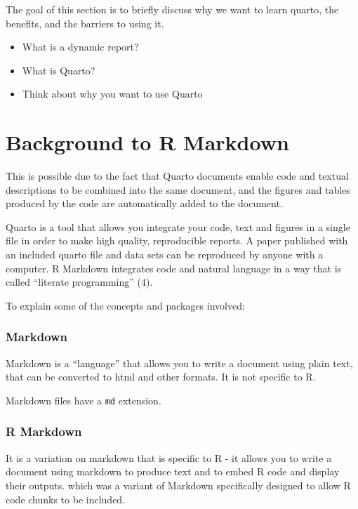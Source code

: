 \documentclass[
  letterpaper,
  DIV=11,
  numbers=noendperiod,
  oneside]{scrreprt}
\providecommand{\tightlist}{%
  \setlength{\itemsep}{0pt}\setlength{\parskip}{0pt}}\usepackage{longtable,booktabs,array}
\begin{document}
The goal of this section is to briefly discuss why we want to learn
quarto, the benefits, and the barriers to using it.

\begin{itemize}
\tightlist
\item
  What is a dynamic report?
\item
  What is Quarto?
\item
  Think about why you want to use Quarto
\end{itemize}

\hypertarget{background-to-r-markdown}{%
\section{Background to R Markdown}\label{background-to-r-markdown}}

This is possible due to the fact that Quarto documents enable code and
textual descriptions to be combined into the same document, and the
figures and tables produced by the code are automatically added to the
document.

Quarto is a tool that allows you integrate your code, text and figures
in a single file in order to make high quality, reproducible reports. A
paper published with an included quarto file and data sets can be
reproduced by anyone with a computer. R Markdown integrates code and
natural language in a way that is called ``literate programming'' (4).

To explain some of the concepts and packages involved:

\hypertarget{markdown}{%
\subsubsection{Markdown}\label{markdown}}

Markdown is a ``language'' that allows you to write a document using
plain text, that can be converted to html and other formats. It is not
specific to R.

Markdown files have a \texttt{md} extension.

\hypertarget{r-markdown}{%
\subsubsection{R Markdown}\label{r-markdown}}

It is a variation on markdown that is specific to R - it allows you to
write a document using markdown to produce text and to embed R code and
display their outputs. which was a variant of Markdown specifically
designed to allow R code chunks to be included.
\end{document}
